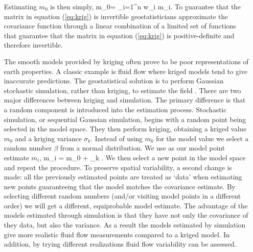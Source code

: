 Estimating $m_0$ is then simply,
\beq
m_0= \sum_{i=1}^{n} w_i m_i.
\eeq
To guarantee that the matrix in equation (\ref{eq:krig})
is invertible geostatisticians approximate
the covariance function
through a linear combination of a limited set of
functions that guarantee that the matrix in equation (\ref{eq:krig}) is
positive-definite and therefore invertible.


The smooth models provided by kriging  often prove
to be poor representations of earth properties.
A classic example is fluid flow where kriged models  tend to give inaccurate
predictions. The geostatistical solution
is to perform Gaussian stochastic simulation, rather than kriging, to
estimate the field \cite{geostat2}.
There are two major  differences between kriging and simulation. 
The primary difference
is that a random component is introduced into the estimation process.   
Stochastic simulation, or  sequential Gaussian simulation, begins
with a random point being selected in the model space.
They then perform kriging, obtaining
a kriged value $m_0$ and  a kriging variance $\sigma_k$.
Instead of using $m_0$ for the model value we
select a  random number $\beta$
from a  normal distribution.
We use as our model point estimate $m_i$,
\beq
m_i = m_0 + \sigma_k \beta.
\eeq
We then select a new point in the model space and repeat the procedure.
To preserve spatial variability,  a second change is made: 
all the previously estimated points are treated as `data' when estimating
new points guaranteeing that the model matches the covariance estimate. 
By selecting different random numbers (and/or visiting model points
in a different order)  we will get a different, equiprobable model
estimate.
The advantage of the models estimated through simulation is that they
have not only the covariance of they data, but also the variance.
As a result the models estimated by simulation
give more realistic fluid flow measurements compared to a kriged model.
In addition, by trying different realizations fluid flow variability
can be assessed.
\par
%
